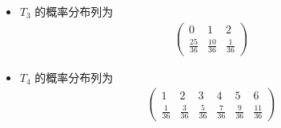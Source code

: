 \begin{frame}
	\begin{itemize}[<+-|alert@+>]

		\item $T_3$ 的概率分布列为 \pause
		      \begin{eqnarray*}
			      \left(\begin{array}{ccc}
				      0             & 1             & 2            \\
				      \frac{25}{36} & \frac{10}{36} & \frac{1}{36}
			      \end{array}\right)
		      \end{eqnarray*}

		\item $T_4$ 的概率分布列为 \pause
		      \begin{eqnarray*}
			      \left(\begin{array}{cccccc}
				      1            & 2            & 3            & 4            & 5            & 6             \\
				      \frac{1}{36} & \frac{3}{36} & \frac{5}{36} & \frac{7}{36} & \frac{9}{36} & \frac{11}{36}
			      \end{array}\right)
		      \end{eqnarray*}
	\end{itemize}

\end{frame}




